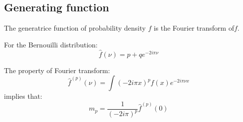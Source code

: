 \documentclass[12pt]{book}
\begin{document}
\subsection{Generating function}
\begin{defn}
The generatrice function of probability
density $f$ is the Fourier transform 
of$f$. 
\end{defn}
\begin{exmp}
For the Bernouilli distribution:
\begin{equation}
\hat{f}(\nu)=p+qe^{-2i\pi \nu}
\end{equation}
\end{exmp}
The property of Fourier transform:
\begin{equation}
\hat{f}^{(p)}(\nu)=\int(-2i\pi x)^p f(x)e^{-2i\pi\nu x}
\end{equation}
implies that:
\begin{equation}
m_p=\frac{1}{(-2i\pi)^p}\hat{f}^{(p)}(0)
\end{equation}
\end{document}
